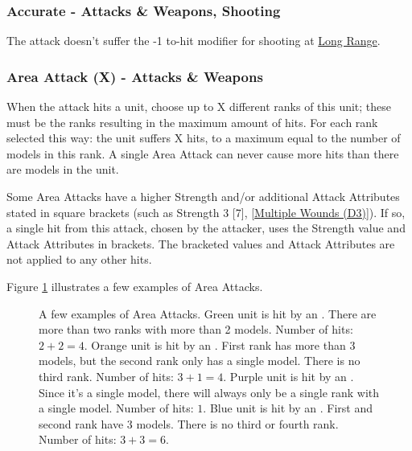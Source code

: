 \subsubsection{Accurate - Attacks \&{} Weapons, Shooting}
\label{accurate}

The attack doesn't suffer the -1 to-hit modifier for shooting at \hyperref[long_range]{Long Range}.

\subsubsection{Area Attack (X) - Attacks \&{} Weapons}
\label{area_attack}

When the attack hits a unit, choose up to X different ranks of this unit; these must be the ranks resulting in the maximum amount of hits. For each rank selected this way: the unit suffers X hits, to a maximum equal to the number of models in this rank. A single Area Attack can never cause more hits than there are models in the unit.

Some Area Attacks have a higher Strength and/or additional Attack Attributes stated in square brackets (such as Strength 3 [7], [\hyperref[multiple_wounds]{Multiple Wounds (D3)}]). If so, a single hit from this attack, chosen by the attacker, uses the Strength value and Attack Attributes in brackets. The bracketed values and Attack Attributes are not applied to any other hits.

Figure \ref{figure/area_attack} illustrates a few examples of Area Attacks.

\newcommand{\figAAOneHit}{\normalfontsize{1 Hit}}
\newcommand{\figAATwoHits}{\normalfontsize{2 Hits}}
\newcommand{\figAAThreeHits}{\normalfontsize{3 Hits}}
\newcommand{\figAATotalOneHit}{Total: 1 Hit}
\newcommand{\figAATotalFourHits}{Total: 4 Hits}
\newcommand{\figAATotalSixHits}{Total: 6 Hits}
\newcommand{\figAAAreaAttack}[1]{\areaattack{#1}}

\begin{figure}[H]
\begin{minipage}{0.55\textwidth}
\centering
\def\svgwidth{\textwidth}

\end{minipage}\hfill\begin{minipage}{0.42\textwidth}
\caption{A few examples of Area Attacks.\captionpar
Green unit is hit by an . There are more than two ranks with more than 2 models.\newline
Number of hits: $ 2 + 2 = 4 $.\captionpar
Orange unit is hit by an . First rank has more than 3 models, but the second rank only has a single model. There is no third rank.\newline
Number of hits: $ 3 + 1 = 4 $.\captionpar
Purple unit is hit by an . Since it's a single model, there will always only be a single rank with a single model.\newline
Number of hits: $ 1 $.\captionpar
Blue unit is hit by an . First and second rank have 3 models. There is no third or fourth rank.\newline
Number of hits: $ 3 + 3 = 6 $.%
}
\label{figure/area_attack}
\end{minipage}
\end{figure}

